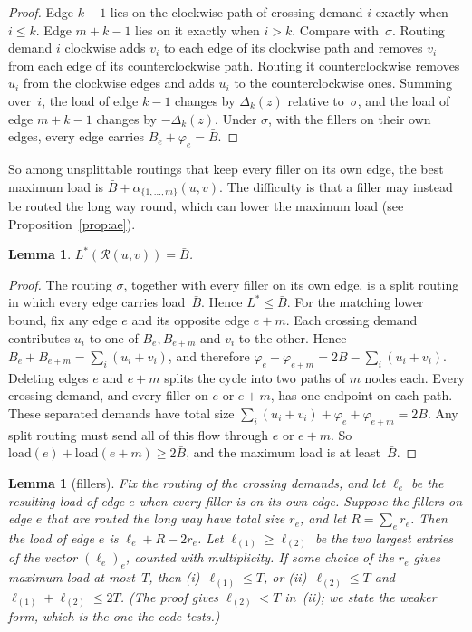 \documentclass[11pt]{article}
\theoremstyle{plain}
\newtheorem{lemma}[theorem]{Lemma}
\theoremstyle{definition}
\theoremstyle{remark}
\begin{document}
\begin{proof}
Edge $k-1$ lies on the clockwise path of crossing demand $i$ exactly when $i\le k$. Edge $m+k-1$ lies on it exactly when $i>k$.
Compare with~$\sigma$. Routing demand $i$ clockwise adds $v_i$ to each edge of its clockwise path and removes $v_i$ from each edge of its counterclockwise path. Routing it counterclockwise removes $u_i$ from the clockwise edges and adds $u_i$ to the counterclockwise ones.
Summing over~$i$, the load of edge $k-1$ changes by $\Delta_k(z)$ relative to~$\sigma$, and the load of edge $m+k-1$ changes by $-\Delta_k(z)$.
Under $\sigma$, with the fillers on their own edges, every edge carries $B_e+\varphi_e=\bar B$.
\end{proof}

So among unsplittable routings that keep every filler on its own edge, the best maximum load is $\bar B+\alpha_{\{1,\dots,m\}}(u,v)$.
The difficulty is that a filler may instead be routed the long way round, which can lower the maximum load (see Proposition~\ref{prop:ae}).

\begin{lemma}\label{lem:lstar}
$L^*(\mathcal{R}(u,v))=\bar B$.
\end{lemma}

\begin{proof}
The routing $\sigma$, together with every filler on its own edge, is a split routing in which every edge carries load~$\bar B$. Hence $L^*\le\bar B$.
For the matching lower bound, fix any edge $e$ and its opposite edge $e+m$.
Each crossing demand contributes $u_i$ to one of $B_e,B_{e+m}$ and $v_i$ to the other. Hence $B_e+B_{e+m}=\sum_i(u_i+v_i)$, and therefore $\varphi_e+\varphi_{e+m}=2\bar B-\sum_i(u_i+v_i)$.
Deleting edges $e$ and $e+m$ splits the cycle into two paths of $m$ nodes each. Every crossing demand, and every filler on $e$ or $e+m$, has one endpoint on each path. These separated demands have total size $\sum_i(u_i+v_i)+\varphi_e+\varphi_{e+m}=2\bar B$.
Any split routing must send all of this flow through $e$ or $e+m$. So $\mathrm{load}(e)+\mathrm{load}(e+m)\ge 2\bar B$, and the maximum load is at least~$\bar B$.
\end{proof}

\begin{lemma}[fillers]\label{lem:filler}
Fix the routing of the crossing demands, and let $\ell_e$ be the resulting load of edge $e$ when every filler is on its own edge.
Suppose the fillers on edge $e$ that are routed the long way have total size $r_e$, and let $R=\sum_er_e$. Then the load of edge $e$ is $\ell_e+R-2r_e$.
Let $\ell_{(1)}\ge\ell_{(2)}$ be the two largest entries of the vector $(\ell_e)_e$, counted with multiplicity. If some choice of the $r_e$ gives maximum load at most~$T$, then
(i)~$\ell_{(1)}\le T$, or
(ii)~$\ell_{(2)}\le T$ and $\ell_{(1)}+\ell_{(2)}\le 2T$.
(The proof gives $\ell_{(2)}<T$ in~(ii); we state the weaker form, which is the one the code tests.)
\end{lemma}
\end{document}
